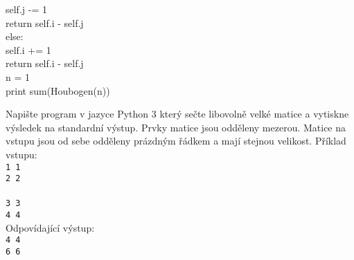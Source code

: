 \documentclass[addpoints,12pt]{exam}
\begin{document}
\begin{questions}
{\hspace*{0.6cm}\hspace*{0.6cm}\hspace*{0.6cm}self.j -= 1\\
\hspace*{0.6cm}\hspace*{0.6cm}\hspace*{0.6cm}return self.i - self.j\\
\hspace*{0.6cm}\hspace*{0.6cm}else:\\
\hspace*{0.6cm}\hspace*{0.6cm}\hspace*{0.6cm}self.i += 1\\
\hspace*{0.6cm}\hspace*{0.6cm}\hspace*{0.6cm}return self.i - self.j\\
n = 1\\
print sum(Houbogen(n))}
\nopagebreak
\begin{choices}
\end{choices}
\question[2]
Napište program v jazyce Python 3 který sečte libovolně velké matice a vytiskne výsledek na standardní výstup. Prvky matice jsou odděleny mezerou. Matice na vstupu jsou od sebe odděleny prázdným řádkem a mají stejnou velikost. Příklad vstupu:\\
\texttt{1 1\\
2 2\\
\\
3 3\\
4 4}\\
Odpovídající výstup:\\
\texttt{4 4\\
6 6}\\


\end{questions}
\end{document}
